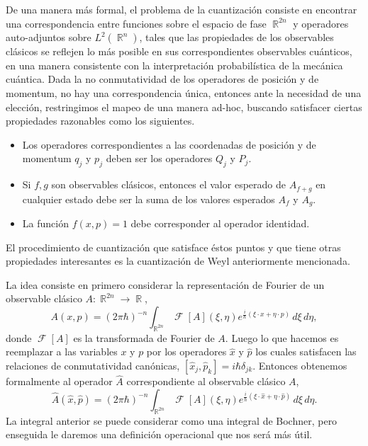 \documentclass[a4paper]{report}
\DeclareMathOperator{\R}{\mathbb{R}}
\DeclareMathOperator{\F}{\mathcal{F}}
\begin{document}
  De una manera más formal, el problema de la cuantización
  consiste en encontrar una correspondencia entre funciones
  sobre el espacio de fase $\R^{2n}$ y operadores
  auto-adjuntos sobre $L^2(\R^{n})$, tales que las
  propiedades de los observables clásicos se reflejen lo más
  posible en sus correspondientes observables cuánticos, en
  una manera consistente con la interpretación
  probabilística de la mecánica cuántica. Dada la no
  conmutatividad de los operadores de posición y de
  momentum, no hay una correspondencia única, entonces ante
  la necesidad de una elección, restringimos el mapeo de una
  manera ad-hoc, buscando satisfacer ciertas propiedades
  razonables como los siguientes.
  \begin{itemize}
    \item Los operadores correspondientes a las coordenadas
      de posición y de momentum $q_j$ y $p_j$ deben ser los
      operadores $Q_j$ y $P_j$.
    \item Si $f,g$ son observables clásicos, entonces el
      valor esperado de $A_{f+g}$ en cualquier estado debe
      ser la suma de los valores esperados  $A_f$ y $A_g$.
    \item La función $f(x,p) = 1$ debe corresponder al
      operador identidad.
  \end{itemize}
  El procedimiento de cuantización que satisface éstos
  puntos y que tiene otras propiedades interesantes es la
  cuantización de Weyl anteriormente mencionada.

  La idea consiste en primero considerar la representación
  de Fourier de un observable clásico $A : \R^{2n} \to \R$, 
  \begin{equation}
    A(x,p)
    = (2\pi\hbar)^{-n} \int_{\R^{2n}} \F[A](\xi,
    \eta) e^{\frac{i}{\hbar} \left( \xi \cdot x + \eta \cdot
    p\right) } \, d\xi \, d\eta,
  \end{equation}
  donde $\F[A]$ es la transformada de Fourier de $A$. Luego
  lo que hacemos es reemplazar a las variables $x$ y $p$ por
  los operadores $\hat{x}$ y $\hat{p}$ los cuales satisfacen
  las relaciones de conmutatividad canónicas, $[\hat{x}_j,
  \hat{p}_k] = i\hbar \delta_{jk}$. Entonces obtenemos
  formalmente al operador $\hat{A}$ correspondiente al
  observable clásico $A$,
  \begin{equation}
    \label{eqn:weyl_quant_1}
    \hat{A}(\hat{x},\hat{p})
    = (2\pi\hbar)^{-n} \int_{\R^{2n}} \F[A](\xi,\eta)
      e^{\frac{i}{\hbar} \left( \xi \cdot \hat{x} + \eta
      \cdot \hat{p}\right) } \, d\xi \, d\eta.
  \end{equation}
  La integral anterior se puede considerar como una integral
  de Bochner, pero enseguida le daremos una definición
  operacional que nos será más útil.
\end{document}
